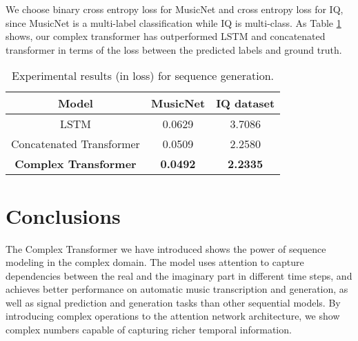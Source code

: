 \documentclass{article}
\begin{document}
We choose binary cross entropy loss for MusicNet and cross entropy loss for IQ, since MusicNet is a multi-label classification while IQ is multi-class. As Table \ref{tab:result_gen} shows, our complex transformer has outperformed LSTM and concatenated transformer in terms of the loss between the predicted labels and ground truth. 


\begin{table}[H]
    \centering
    \caption{Experimental results (in loss) for sequence generation.}
    \begin{tabular}{c c c}
        \toprule
        Model & MusicNet & IQ dataset   \\
        \midrule
        LSTM & 0.0629 & 3.7086 \\
        Concatenated Transformer & 0.0509 & 2.2580 \\
        \textbf{Complex Transformer} & \textbf{0.0492} & \textbf{2.2335} \\
        \bottomrule
    \end{tabular}
    \label{tab:result_gen}
\end{table}

\section{Conclusions}

The Complex Transformer we have introduced shows the power of sequence modeling in the complex domain. The model uses attention to capture dependencies between the real and the imaginary part in different time steps, and achieves better performance on automatic music transcription and generation, as well as signal prediction and generation tasks than other sequential models. By introducing complex operations to the attention network architecture, we show complex numbers capable of capturing richer temporal information.



\vfill\pagebreak



\end{document}
